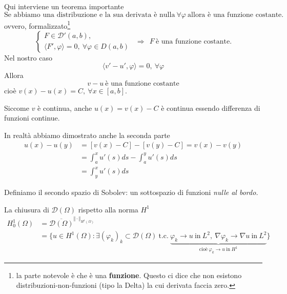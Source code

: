 \documentclass[10pt,a4paper,twoside,openright]{book}
\begin{document}
\begin{dimostrazione}
Qui interviene un teorema importante
\begin{equation*}
	\boxed{\text{Se abbiamo una distribuzione e la sua derivata è nulla} \ \forall \varphi \ \text{allora è una funzione costante.}}
\end{equation*}
ovvero, formalizzato\footnote{la parte notevole è che è una \textbf{funzione}. Questo ci dice che non esistono distribuzioni-non-funzioni (tipo la Delta) la cui derivata faccia zero.}
\begin{equation*}
	\boxed{\begin{cases}
		F\in \mathcal{D} '( a,b) ,\\
		\langle F',\varphi \rangle =0,\ \forall \varphi \in D( a,b)
		\end{cases} \ \ \Rightarrow \ \ F\ \text{è una funzione costante.}}
\end{equation*}
Nel nostro caso
\begin{equation*}
	\langle v'-u',\varphi \rangle =0,\ \forall \varphi 
\end{equation*}
Allora
\begin{equation*}
	v-u\ \text{è una funzione costante}
\end{equation*}
cioè $v( x) -u( x) =C,\ \forall x\in [ a,b]$.

Siccome $v$ è continua, anche $u( x) =v( x) -C$ è continua essendo differenza di funzioni continue.

In realtà abbiamo dimostrato anche la seconda parte
\begin{align*}
	u( x) -u( y) & =[ v( x) -C] -[ v( y) -C] =v( x) -v( y)          \\
	             & =\int ^{x}_{a} u'( s) ds-\int ^{y}_{a} u'( s) ds \\
	             & =\int ^{x}_{y} u'( s) ds                         
\end{align*}
\end{dimostrazione}
Definiamo il secondo spazio di Sobolev: un sottospazio di funzioni \textit{nulle al bordo.}
\begin{definition}
	La chiusura di $\mathcal{D}( \Omega )$ rispetto alla norma $H^{1}$
	\begin{align*}
		H^{1}_{0}( \Omega ) & =\overline{\mathcal{D}( \Omega )}^{\Vert \cdotp \Vert _{H^{1}( \Omega )}}                                                                                                                                                                                                                             \\
		                    & =\bigg\{u\in H^{1}( \Omega ) :\exists ( \varphi _{k})_{k} \subset \mathcal{D}( \Omega ) \ \text{t.c.} \ \underbrace{\varphi _{k}\rightarrow u\ \text{in} \ L^{2} ,\ \nabla \varphi _{k}\rightarrow \nabla u\ \text{in} \ L^{2}}_{\text{cioè} \ \varphi _{k}\rightarrow u\ \text{in} \ H^{1}}\bigg\} 
	\end{align*}
\end{definition}
\end{document}
